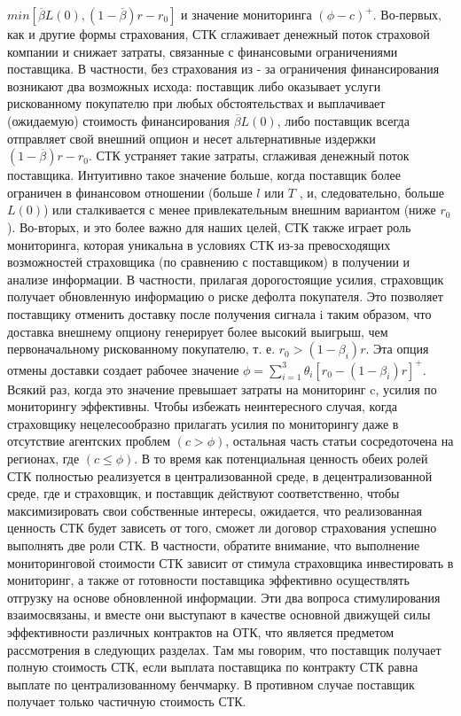 \documentclass[a4paper,12pt]{article}
\begin{document}
$min\left[ \overline{\beta}L(0),
(1 -\overline{\beta})r - r_{0} \right]$ и значение мониторинга $(\phi - c)^{+}$. Во-первых, как и другие формы страхования, СТК сглаживает денежный поток страховой компании и снижает затраты, связанные с финансовыми ограничениями поставщика. В частности, без страхования из - за ограничения финансирования возникают два возможных исхода: поставщик либо оказывает услуги рискованному покупателю при любых обстоятельствах и выплачивает (ожидаемую) стоимость финансирования $\overline{\beta}L(0)$, либо поставщик всегда отправляет свой внешний опцион и несет альтернативные издержки $(1 -\overline{\beta})r - r_{0}$. СТК устраняет такие затраты, сглаживая денежный поток поставщика. Интуитивно такое значение больше, когда поставщик более ограничен в финансовом отношении (больше $l$ или $T$ , и, следовательно, больше $L(0)$) или сталкивается с менее привлекательным внешним вариантом (ниже $r_{0}$).
Во-вторых, и это более важно для наших целей, СТК также играет роль мониторинга, которая уникальна в условиях СТК из-за превосходящих возможностей страховщика (по сравнению с поставщиком) в получении и анализе информации. В частности, прилагая дорогостоящие усилия, страховщик получает обновленную информацию о риске дефолта покупателя. Это позволяет поставщику отменить доставку после получения сигнала i таким образом, что доставка внешнему опциону генерирует более высокий выигрыш, чем первоначальному рискованному покупателю, т. е. $r_{0} > (1-\beta_{i})r$. Эта опция отмены доставки создает рабочее значение $\phi = \sum_{i = 1}^{3}\theta_{i}\left[ r_{0} - (1-\beta_{i})r \right]^{+}$. Всякий раз, когда это значение превышает затраты на мониторинг c, усилия по мониторингу эффективны. Чтобы избежать неинтересного случая, когда страховщику нецелесообразно прилагать усилия по мониторингу даже в отсутствие агентских проблем $(c > \phi)$, остальная часть статьи сосредоточена на регионах, где $(c \leq \phi)$.
В то время как потенциальная ценность обеих ролей СТК полностью реализуется в централизованной среде, в децентрализованной среде, где и страховщик, и поставщик действуют соответственно, чтобы максимизировать свои собственные интересы, ожидается, что реализованная ценность СТК будет зависеть от того, сможет ли договор страхования успешно выполнять две роли СТК. В частности, обратите внимание, что выполнение мониторинговой стоимости СТК зависит от стимула страховщика инвестировать в мониторинг, а также от готовности поставщика эффективно осуществлять отгрузку на основе обновленной информации. Эти два вопроса стимулирования взаимосвязаны, и вместе они выступают в качестве основной движущей силы эффективности различных контрактов на ОТК, что является предметом рассмотрения в следующих разделах. Там мы говорим, что поставщик получает полную стоимость СТК, если выплата поставщика по контракту СТК равна выплате по централизованному бенчмарку. В противном случае поставщик получает только частичную стоимость СТК.
\end{document}
